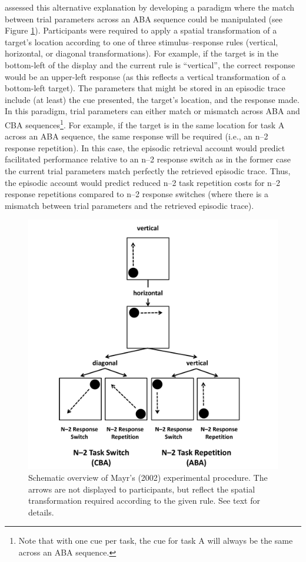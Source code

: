 \documentclass[a4paper, doc, natbib]{apa6}
\begin{document}
\cite{Mayr2002} assessed this alternative explanation by developing a paradigm where the match between trial parameters across an ABA sequence could be manipulated (see Figure \ref{fig:mayrExperiment}). Participants were required to apply a spatial transformation of a target's location according to one of three stimulus--response rules (vertical, horizontal, or diagonal transformations). For example, if the target is in the bottom-left of the display and the current rule is ``vertical'', the correct response would be an upper-left response (as this reflects a vertical transformation of a bottom-left target). The parameters that might be stored in an episodic trace include (at least) the cue presented, the target's location, and the response made. In this paradigm, trial parameters can either match or mismatch across ABA and CBA sequences\footnote{Note that with one cue per task, the cue for task A will always be the same across an ABA sequence.}. For example, if the target is in the same location for task A across an ABA sequence, the same response will be required (i.e., an n--2 response repetition). In this case, the episodic retrieval account would predict facilitated performance relative to an n--2 response switch as in the former case the current trial parameters match perfectly the retrieved episodic trace. Thus, the episodic account would predict reduced n--2 task repetition costs for n--2 response repetitions compared to n--2 response switches (where there is a mismatch between trial parameters and the retrieved episodic trace).

\begin{figure}
\begin{center}
\includegraphics[width = \textwidth]{Images/mayrExperiment.pdf}
\caption{Schematic overview of Mayr's (2002) experimental procedure. The arrows are not displayed to participants, but reflect the spatial transformation required according to the given rule. See text for details.}
\label{fig:mayrExperiment}
\end{center}
\end{figure}
\end{document}
